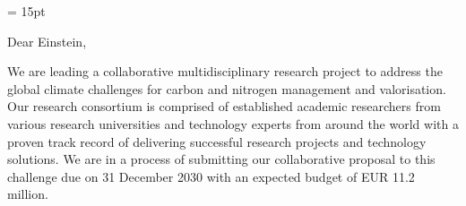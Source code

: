 \documentclass{amm-pst-letter}
\begin{document}
\thispagestyle{letterhead}
\pagestyle{fancy}
\renewcommand{\letterLogo}{\rput(0,-1.5){\psLogoJapanLady[iconWidth=10]}}
\renewcommand{\letterHead}{\rput[lc](4,-0.5){\textsc{Dolphin}}}
\renewcommand{\fromName}{Mother Theresa}
\renewcommand{\fromRank}{PhD MBA}
\renewcommand{\fromDuty}{Chief Executive Officer}
\renewcommand{\fromDept}{Global Research Center}
\renewcommand{\fromPost}{Markt 11, 12345 Berlin\\Brandenburg,
Germany}
\renewcommand{\fromFone}{+44.123.123.1234}
\renewcommand{\fromMail}{ceoh@dolphin.com}
\renewcommand{\fromSite}{\urlColor{teal}\href{https://js-svg-client.onrender.com/}{Dolphin.com}}
\renewcommand{\fromSize}{36mm}
\renewcommand{\letterDate}{11 September 2022}
\renewcommand{\concerning}{Participation in Global Project}
\renewcommand{\toName}{Professor Dr. Albert Einstein}
\renewcommand{\toRank}{}
\renewcommand{\toDuty}{Head of Research}
\renewcommand{\toDept}{Global Research and Development}
\renewcommand{\toPost}{Building 1234, Innovation Center 123 \\123453
Berlin, Germany}
\renewcommand{\toFone}{}
\renewcommand{\toMail}{}%


\printAddress
\par
\baselineskip = 15pt


Dear Einstein,

We are leading a collaborative multidisciplinary research project to
address the global climate challenges for carbon and nitrogen management and valorisation. Our research consortium is comprised of established academic researchers from various research universities and technology experts from around the world with a proven track record of delivering successful research projects and technology solutions. We are in a process of submitting our collaborative proposal to this challenge due on 31 December 2030 with an
expected budget of EUR 11.2 million.
\end{document}
